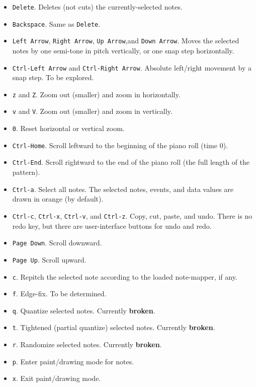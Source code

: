    \begin{itemize}
      \item \texttt{Delete}.  Deletes (not cuts) the currently-selected notes.
      \item \texttt{Backspace}.  Same as \texttt{Delete}.
      \item \texttt{Left Arrow}, \texttt{Right Arrow},
         \texttt{Up Arrow},and \texttt{Down Arrow}.
         Moves the selected notes by one semi-tone in pitch vertically, or
         one snap step horizontally.
      \item \texttt{Ctrl-Left Arrow} and \texttt{Ctrl-Right Arrow}.
         Absolute left/right movement by a snap step. To be explored.
      \item \texttt{z} and \texttt{Z}.  Zoom out (smaller) and zoom in
         horizontally.
      \item \texttt{v} and \texttt{V}.  Zoom out (smaller) and zoom in
         vertically.
      \item \texttt{0}. Reset horizontal or vertical zoom.
      \item \texttt{Ctrl-Home}.  Scroll leftward to the beginning of the
         piano roll (time 0).
      \item \texttt{Ctrl-End}.  Scroll rightward to the end of the
         piano roll (the full length of the pattern).
      \item \texttt{Ctrl-a}.  Select all notes.  The selected notes, events,
         and data values are drawn in orange (by default).
      \item \texttt{Ctrl-c}, \texttt{Ctrl-x}, \texttt{Ctrl-v}, and
         \texttt{Ctrl-z}.  Copy, cut, paste, and undo. There is no redo key,
         but there are user-interface buttons for undo and redo.
      \item \texttt{Page Down}.  Scroll downward.
      \item \texttt{Page Up}.  Scroll upward.
      \item \texttt{c}.  Repitch the selected note according to the loaded
         note-mapper, if any.
      \item \texttt{f}.  Edge-fix.  To be determined.
      \item \texttt{q}.  Quantize selected notes.
         Currently \textbf{broken}.
      \item \texttt{t}.  Tightened (partial quantize) selected notes.
         Currently \textbf{broken}.
      \item \texttt{r}.  Randomize selected notes.
         Currently \textbf{broken}.
      \item \texttt{p}.  Enter paint/drawing mode for notes.
      \item \texttt{x}.  Exit paint/drawing mode.
   \end{itemize}

